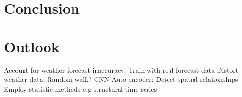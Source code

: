 \documentclass[11pt,table]{article}
\begin{document}
\section{Conclusion}
\section{Outlook}
Account for weather forecast inaccuracy:
Train with real forecast data
Distort weather data: Random walk?
CNN Auto-encoder: Detect spatial relationships
Employ statistic methods
e.g structural time series





\begin{footnotesize}







%	
%	
%	
%	


\end{footnotesize}


\end{document}
